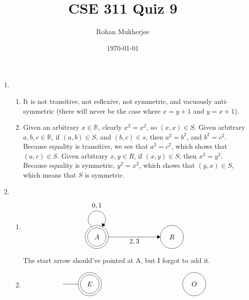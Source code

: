 \documentclass[12pt]{article}
\title{CSE 311 Quiz 9}
\date{\today}
\author{Rohan Mukherjee}
\theoremstyle{definition}
\theoremstyle{remark}
\newcommand{\R}{\mathbb{R}}
\newcommand\setItemnumber[1]{\setcounter{enumi}{\numexpr#1-1\relax}}
\begin{document}
	\maketitle
	\begin{enumerate}[leftmargin=\labelsep]
		\item \begin{enumerate}
			\item It is not transitive, not reflexive, not symmetric, and vacuously anti-symmetric (there will never be the case where $x = y+1$ and $y = x+1$).
			\item Given an arbitrary $x \in \R$, clearly $x^2=x^2$, so $(x, x) \in S$. Given arbitrary $a, b, c \in \R$, if $(a, b) \in S$, and $(b, c) \in s$, then $a^2=b^2$, and $b^2=c^2$. Because equality is transitive, we see that $a^2=c^2$, which shows that $(a, c) \in S$. Given arbitrary $x, y \in R$, if $(x, y) \in S$, then $x^2=y^2$. Because equality is symmetric, $y^2=x^2$, which shows that $(y, x) \in S$, which means that $S$ is symmetric.
		\end{enumerate}
		\setItemnumber{3}
		\item
		\begin{enumerate}
			\item \begin{align*}
				\begin{tikzpicture}[scale=0.2]
					\tikzstyle{every node}+=[inner sep=0pt]
					\draw [black] (26.6,-24) circle (3);
					\draw (26.6,-24) node {$A$};
					\draw [black] (26.6,-24) circle (2.4);
					\draw [black] (46,-24) circle (3);
					\draw (46,-24) node {$R$};
					\draw [black] (25.277,-21.32) arc (234:-54:2.25);
					\draw (26.6,-16.75) node [above] {$0,1$};
					\fill [black] (27.92,-21.32) -- (28.8,-20.97) -- (27.99,-20.38);
					\draw [black] (29.6,-24) -- (43,-24);
					\fill [black] (43,-24) -- (42.2,-23.5) -- (42.2,-24.5);
					\draw (36.3,-24.5) node [below] {$2,3$};
				\end{tikzpicture}
			\end{align*}
			The start arrow should've pointed at A, but I forgot to add it.
			\item 
			\begin{align*}
				\begin{tikzpicture}[scale=0.2]
					\tikzstyle{every node}+=[inner sep=0pt]
					\draw [black] (13.4,-29) circle (3);
					\draw (13.4,-29) node {$E$};
					\draw [black] (13.4,-29) circle (2.4);
					\draw [black] (40.4,-29) circle (3);
					\draw (40.4,-29) node {$O$};
					\draw [black] (6.5,-29) -- (10.4,-29);

\end{tikzpicture}
\end{align*}
\end{enumerate}
\end{enumerate}
\end{document}
